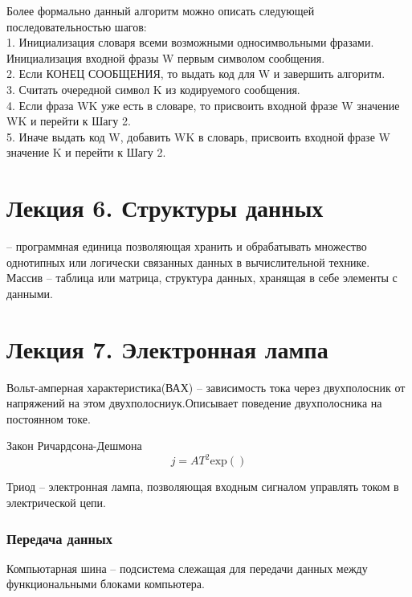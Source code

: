 \documentclass[a4paper, 12pt]{article}
\begin{document}
 Более формально данный алгоритм можно описать следующей последовательностью шагов:\\
    1. Инициализация словаря всеми возможными односимвольными фразами. Инициализация входной фразы W первым символом сообщения.\\
    2. Если КОНЕЦ СООБЩЕНИЯ, то выдать код для W и завершить алгоритм.\\
    3. Считать очередной символ K из кодируемого сообщения.\\
    4. Если фраза WK уже есть в словаре, то присвоить входной фразе W значение WK и перейти к Шагу 2.\\
    5. Иначе выдать код W, добавить WK в словарь, присвоить входной фразе W значение K и перейти к Шагу 2.\\



\section*{Лекция 6. Структуры данных}
-- программная единица позволяющая хранить и обрабатывать множество однотипных или логически связанных данных в вычислительной технике.\\

Массив -- таблица или матрица, структура данных, хранящая в себе элементы с данными.

\section*{Лекция 7. Электронная лампа}
Вольт-амперная характеристика(ВАХ) -- зависимость тока через двухполосник от напряжений на этом двухполосниук.Описывает поведение двухполосника на постоянном токе.\\

\begin{mdframed}[backgroundcolor=blue!20] 
       Закон Ричардсона-Дешмона\\
       \[
         j = AT^2 \text{exp}()
       \]
    \end{mdframed}
    
Триод -- электронная лампа, позволяющая входным сигналом управлять током в электрической цепи.\\

\subsubsection*{Передача данных}
Компьютарная шина -- подсистема слежащая для передачи данных между функциональными блоками компьютера.\\
\end{document}
